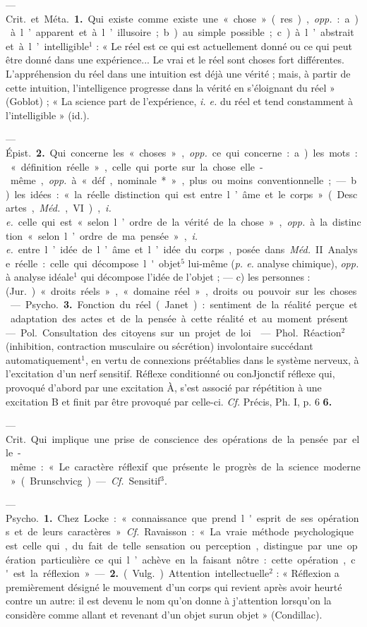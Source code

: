 \begin{itemize}[leftmargin=1cm, label=, itemsep=1pt]
 — \si{Crit.} et \si{Méta.} {\bf 1.} Qui existe
comme existe une « chose » (res),
{\it opp.} : a) à l’apparent et à l’illusoire;
b) au simple possible; c) à l’abstrait
et à l’intelligible$^1$ : « Le réel est ce
qui est actuellement donné ou ce
qui peut être donné dans une expérience... Le vrai et le réel sont choses
fort différentes. L’appréhension du
réel dans une intuition est déjà une
vérité ; mais, à partir de cette intuition, l'intelligence progresse dans la
vérité en s’éloignant du réel »
(Goblot) ; « La science part de l’expérience, {\it i. e.} du réel et tend constamment à l'intelligible » (id.).

— \si{Épist.} {\bf 2.} Qui concerne les
« choses », {\it opp.} ce qui concerne :
a) les mots : « définition réelle », celle
qui porte sur la chose elle-même,
{\it opp.} à « déf, nominale* », plus ou
moins conventionnelle ; — b) les
idées : « la réelle distinction qui est
entre l’âme et le corps » (Descartes,
\si{{\it Méd.}}, VI), {\it i. e.} celle qui est « selon
l’ordre de la vérité de la chose »,
{\it opp.} à la distinction « selon l’ordre
de ma pensée », {\it i. e.} entre l’idée de
l’âme et l’idée du corps, posée dans
\si{{\it Méd.}} II. Analyse réelle : celle qui
décompose l'objet$^5$ lui-même ({\it p. e.}
analyse chimique), {\it opp.} à analyse
idéale$^1$ qui décompose l'idée de
l’objet ; — c) les personnes : (\si{Jur.})
« droits réels », « domaine réel »,
droits ou pouvoir sur les choses.

— \si{Psycho.} {\bf 3.} Fonction du réel
(Janet) : sentiment de la réalité
perçue et adaptation des actes et
de la pensée à cette réalité et au
moment présent.

 — \si{Pol.} Consultation des
citoyens sur un projet de loi.

 — \si{Phol.} Réaction$^2$ (inhibition, contraction musculaire ou sécrétion) involontaire succédant automatiquement$^1$, en vertu de connexions préétablies dans le système
nerveux, à l'excitation d’un nerf
sensitif. Réflexe conditionné ou conJjonctif réflexe qui, provoqué
d’abord par une excitation À, s’est
associé par répétition à une excitation B et finit par être provoqué par
celle-ci. {\it Cf.} Précis, Ph. I, p. 6 {\bf 6.}

 — \si{Crit.} Qui implique une
prise de conscience des opérations de
la pensée par elle-même : « Le caractère réflexif que présente le progrès
de la science moderne » (Brunschvicg). — {\it Cf.} Sensitif$^3$.

 — \si{Psycho.} {\bf 1.} Chez Locke :
« connaissance que prend l'esprit de
ses opérations et de leurs caractères ». {\it Cf.} Ravaisson : « La vraie
méthode psychologique est celle
qui, du fait de telle sensation ou
perception, distingue par une opération particulière ce qui l’achève en
la faisant nôtre : cette opération,
c'est la réflexion. » — {\bf 2.} (\si{Vulg.})
Attention intellectuelle$^2$ : « Réflexion
a premièrement désigné le mouvement d’un corps qui revient après
avoir heurté contre un autre: il est
devenu le nom qu'on donne à j'attention lorsqu'on la considère comme
allant et revenant d’un objet surun
objet » (Condillac).


\end{itemize}
